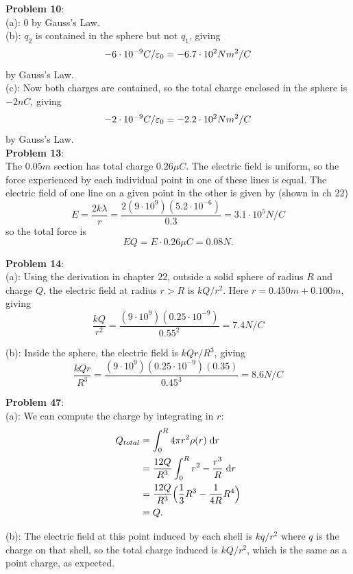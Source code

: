 \documentclass{amsart}
\begin{document}
	\textbf{Problem 10}: \\
	
	(a): 0 by Gauss's Law.\\
	
	(b): $q_2$ is contained in the sphere but not $q_1$, giving 
	$$-6\cdot 10^{-9} C / \varepsilon_0 = -6.7 \cdot 10^2 N m^2/C$$
	by Gauss's Law.\\
	
	(c): Now both charges are contained, so the total charge enclosed in the sphere is $-2nC$, giving 
	$$-2 \cdot 10^{-9} C / \varepsilon_0 = -2.2 \cdot 10^2 N m^2/C$$
	by Gauss's Law.\\
	
	\textbf{Problem 13}: \\
	
	The $0.05m$ section has total charge $0.26 \mu C$. The electric field is uniform, so the force experienced by each individual point in one of these lines is equal. The electric field of one line on a given point in the other is given by (shown in ch 22)
	$$
	E = \frac{2k\lambda}{r} = \frac{2(9\cdot 10^9)(5.2 \cdot 10^{-6})}{0.3} = 3.1\cdot 10^5 N/C
	$$
	so the total force is 
	$$
	EQ = E\cdot 0.26 \mu C = 0.08 N.
	$$
	
	\textbf{Problem 14}: \\
	(a): Using the derivation in chapter 22, outside a solid sphere of radius $R$ and charge $Q$, the electric field at radius $r>R$ is $kQ/r^2$. Here $r=0.450m+0.100m$, giving
	$$
	\frac{kQ}{r^2} = \frac{(9\cdot 10^9)(0.25 \cdot 10^{-9})}{0.55^2} = 7.4 N/C
	$$
	
	(b): Inside the sphere, the electric field is $kQr/R^3$, giving
	$$
	\frac{kQr}{R^3} = \frac{(9\cdot 10^9)(0.25 \cdot 10^{-9})(0.35)}{0.45^3} = 8.6 N/C
	$$
	
	\textbf{Problem 47}: \\
	
	(a): We can compute the charge by integrating in $r$:
	\begin{align*}
		Q_{total} &= \int_0^R 4\pi r^2 \rho(r) \; \textrm{d} r\\
		&= \frac{12 Q}{R^3} \int_0^R r^2 - \frac{r^3}{R} \; \textrm{d} r\\
		&= \frac{12 Q}{R^3} \Big(\frac{1}{3} R^3 - \frac{1}{4R} R^4\Big)\\
		&= Q.
	\end{align*}
	
	(b): The electric field at this point induced by each shell is $kq/r^2$ where $q$ is the charge on that shell, so the total charge induced is $kQ/r^2$, which is the same as a point charge, as expected.\\
	
\end{document}
